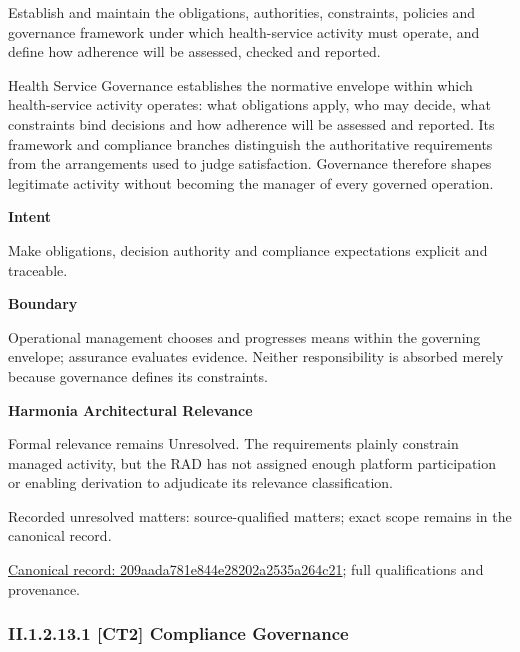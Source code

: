 Establish and maintain the obligations, authorities, constraints, policies and governance framework under which health-service activity must operate, and define how adherence will be assessed, checked and reported.



Health Service Governance establishes the normative envelope within which health-service activity operates: what obligations apply, who may decide, what constraints bind decisions and how adherence will be assessed and reported. Its framework and compliance branches distinguish the authoritative requirements from the arrangements used to judge satisfaction. Governance therefore shapes legitimate activity without becoming the manager of every governed operation.



\textbf{Intent}



Make obligations, decision authority and compliance expectations explicit and traceable.



\textbf{Boundary}



Operational management chooses and progresses means within the governing envelope; assurance evaluates evidence. Neither responsibility is absorbed merely because governance defines its constraints.



\textbf{Harmonia Architectural Relevance}



Formal relevance remains Unresolved. The requirements plainly constrain managed activity, but the RAD has not assigned enough platform participation or enabling derivation to adjudicate its relevance classification.


{\small Recorded unresolved matters: source-qualified matters; exact scope remains in the canonical record.}\par
{\footnotesize \href{../../../../../../../continuum/strategy/capability/209aada781e844e28202a2535a264c21.md}{Canonical record: 209aada781e844e28202a2535a264c21}; full qualifications and provenance.}\par
\subsubsection*{II.1.2.13.1 [CT2] Compliance Governance}
\label{navigation:II.1.2.13.1}

